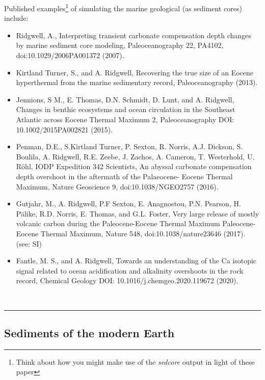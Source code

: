 \noindent Published examples\footnote{Think about how you might make use of the \textit{sedcore} output in light of these paper} of simulating the marine geological (as sediment cores) include:
\vspace{1mm}
\small\begin{itemize}[noitemsep]
\item Ridgwell, A., Interpreting transient carbonate compensation depth changes by marine sediment core modeling, Paleoceanography 22, PA4102, doi:10.1029/2006PA001372 (2007).
\item Kirtland Turner, S., and A. Ridgwell, Recovering the true size of an Eocene hyperthermal from the marine sedimentary record, Paleoceanography (2013).
\item Jennions, S M., E. Thomas, D.N. Schmidt, D. Lunt, and A. Ridgwell, Changes in benthic ecosystems and ocean circulation in the Southeast Atlantic across Eocene Thermal Maximum 2, Paleoceanography DOI: 10.1002/2015PA002821 (2015).
\item Penman, D.E., S.Kirtland Turner, P. Sexton, R. Norris, A.J. Dickson, S. Boulila, A. Ridgwell, R.E. Zeebe, J. Zachos, A. Cameron, T. Westerhold, U. Röhl, IODP Expedition 342 Scientists, An abyssal carbonate compensation depth overshoot in the aftermath of the Palaeocene- Eocene Thermal Maximum, Nature Geoscience 9, doi:10.1038/NGEO2757 (2016).
\item Gutjahr, M., A. Ridgwell, P.F Sexton, E. Anagnostou, P.N. Pearson, H. Pälike, R.D. Norris, E. Thomas, and G.L. Foster, Very large release of mostly volcanic carbon during the Paleocene-Eocene Thermal Maximum Paleocene-Eocene Thermal Maximum, Nature 548, doi:10.1038/nature23646 (2017). (see: SI)
\item Fantle, M. S., and A. Ridgwell, Towards an understanding of the Ca isotopic signal related to ocean acidification and alkalinity overshoots in the rock record, Chemical Geology DOI: 10.1016/j.chemgeo.2020.119672 (2020).
\end{itemize}\normalsize\

\vspace{1mm}\noindent\rule{4cm}{0.1mm}\vspace{2mm}

\newpage

\subsection{Sediments of the modern Earth}

